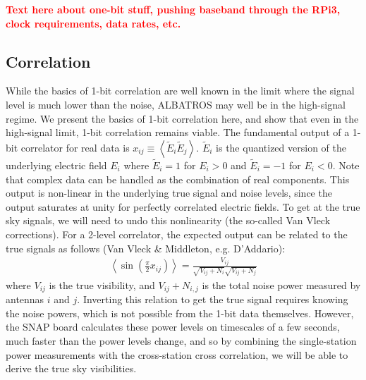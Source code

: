 \documentclass{ws-jai}
\newcommand{\attention}[1]{\textcolor{red}{\bf {#1}}}
\begin{document}
\attention{Text here about one-bit stuff, pushing baseband through the RPi3,
clock requirements, data rates, etc.}

\subsection{Correlation}
While the basics of 1-bit correlation are well known in the limit where the signal level is much lower than the noise, ALBATROS may well be in the high-signal regime.  We present the basics of 1-bit correlation here, and show that even in the high-signal limit, 1-bit correlation remains viable.
The fundamental output of a 1-bit correlator for real data is $x_{ij} \equiv \left < \tilde{E}_i \tilde{E}_j \right >$.  $ \tilde{E}_i$ is the quantized version of the underlying electric field $E_i$ where $ \tilde{E}_i=1$ for $E_i>0$ and $ \tilde{E}_i=-1$ for $E_i<0$.  Note that complex data can be handled as the combination of real components.  This output is non-linear in the underlying true signal and noise levels, since the output saturates at unity for perfectly correlated electric fields.  To get at the true sky signals, we will need to undo this nonlinearity (the so-called Van Vleck corrections).  For a 2-level correlator, the expected output can be related to the true signals as follows (Van Vleck \& Middleton, e.g. D'Addario):
\begin{eqnarray}
\label{eqn:1bit_output}
\left < \sin(\frac{\pi}{2}x_{ij})\right > = \frac{V_{ij}}{\sqrt{V_{ij}+N_i}\sqrt{V_{ij}+N_j}}
\end{eqnarray}
where $V_{ij}$ is the true visibility, and $V_{ij}+N_{i,j}$ is the total noise power measured by antennas $i$ and $j$.  Inverting this relation to get the true signal requires knowing the noise powers, which is not possible from the 1-bit data themselves.  However, the SNAP board calculates these power levels on timescales of a few seconds, much faster than the power levels change, and so by combining the single-station power measurements with the cross-station cross correlation, we will be able to derive the true sky visibilities.  
\end{document}
